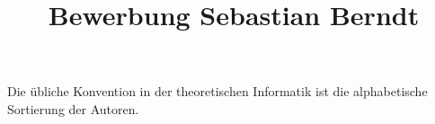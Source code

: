 \documentclass[a4paper,skipsamekey,11pt,ngerman]{curve}
\title{Bewerbung Sebastian Berndt}
\begin{document}
\maketitle

\newpage
{}

\newpage
Die übliche Konvention in der theoretischen Informatik ist die alphabetische Sortierung der Autoren.







%
\end{document}
